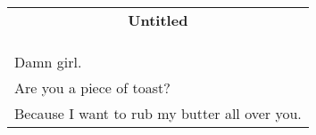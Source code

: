 \documentclass{article}
\begin{document}
\newcommand{\h}{\hspace*{2ex}}
\newcommand{\HHHH}{\hspace*{32ex}}

\begin{center}
\begin{tabular}{l}
\multicolumn{1}{c}{\large\textbf{Untitled}} \\
\\\hline\\
\\
Damn girl. \\
Are you a piece of toast? \\
Because I want to rub my butter all over you. \\
\end{tabular}
\end{center}
\end{document}
